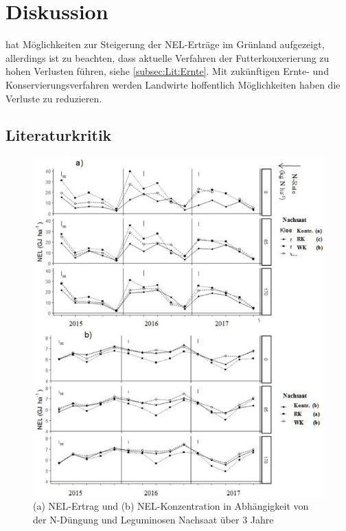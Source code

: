 
\section{Diskussion}
\label{sec:Disukussion}
\textcite[33-36]{weggler2050leguminosen} hat Möglichkeiten zur Steigerung der \ac{NEL}-Erträge im Grünland aufgezeigt, allerdings ist zu beachten, dass aktuelle Verfahren der Futterkonxerierung zu hohen Verlusten führen, siehe \cref{subsec:Lit:Ernte}. 
Mit zukünftigen Ernte- und Konservierungsverfahren werden Landwirte hoffentlich Möglichkeiten haben die Verluste zu reduzieren.

\subsection{Literaturkritik}
\label{sub:kritik}

\begin{figure}
	\includegraphics[scale=0.75]{images/wegglerAbb1}
	\caption[(a) \acs{NEL}-Ertrag und (b) \acs{NEL}-Konzentration in Abhängigkeit von der N-Düngung und Leguminosen Nachsaat über 3 Jahre]{(a) \ac{NEL}-Ertrag und (b) \ac{NEL}-Konzentration in Abhängigkeit von der N-Düngung und Leguminosen Nachsaat über 3 Jahre \parencite[35]{weggler2050leguminosen}}
	\label{fig:wegglerAbb1}
\end{figure}

